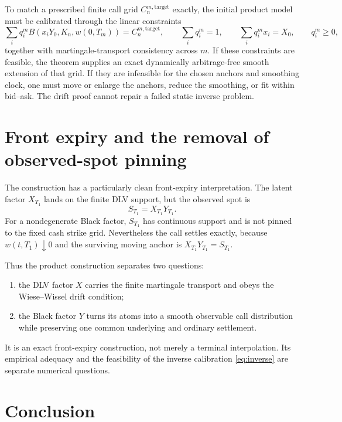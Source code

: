 \documentclass[11pt,a4paper]{article}
\begin{document}
To match a prescribed finite call grid $C_n^{m,\mathrm{target}}$ exactly, the
initial product model must be calibrated through the linear constraints
\begin{equation}
 \sum_iq_i^m B(x_iY_0,K_n,w(0,T_m))
 =C_n^{m,\mathrm{target}},\qquad
 \sum_iq_i^m=1,\qquad
 \sum_iq_i^mx_i=X_0,\qquad q_i^m\geq0,
 \label{eq:inverse}
\end{equation}
together with martingale-transport consistency across $m$.  If these
constraints are feasible, the theorem supplies an exact dynamically
arbitrage-free smooth extension of that grid.  If they are infeasible for the
chosen anchors and smoothing clock, one must move or enlarge the anchors,
reduce the smoothing, or fit within bid--ask.  The drift proof cannot repair a
failed static inverse problem.

\section{Front expiry and the removal of observed-spot pinning}

The construction has a particularly clean front-expiry interpretation.  The
latent factor $X_{T_1}$ lands on the finite DLV support, but the observed spot
is
\[
 S_{T_1}=X_{T_1}Y_{T_1}.
\]
For a nondegenerate Black factor, $S_{T_1}$ has continuous support and is not
pinned to the fixed cash strike grid.  Nevertheless the call settles exactly,
because $w(t,T_1)\downarrow0$ and the surviving moving anchor is
$X_{T_1}Y_{T_1}=S_{T_1}$.

Thus the product construction separates two questions:
\begin{enumerate}
\item the DLV factor $X$ carries the finite martingale transport and obeys the
Wiese--Wissel drift condition;
\item the Black factor $Y$ turns its atoms into a smooth observable call
distribution while preserving one common underlying and ordinary settlement.
\end{enumerate}
It is an exact front-expiry construction, not merely a terminal interpolation.
Its empirical adequacy and the feasibility of the inverse calibration
\eqref{eq:inverse} are separate numerical questions.

\section{Conclusion}
\end{document}
